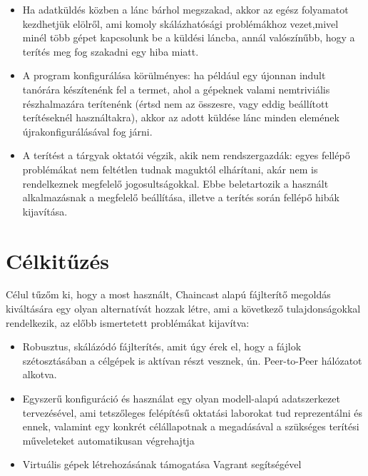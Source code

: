\begin{itemize}
  \item Ha adatküldés közben a lánc bárhol megszakad, akkor az egész folyamatot kezdhetjük elölről, ami komoly skálázhatósági problémákhoz vezet,mivel minél több gépet kapcsolunk be a küldési láncba, annál valószínűbb, hogy a terítés meg fog szakadni egy hiba miatt.
   \item A program konfigurálása körülményes: ha például egy újonnan indult tanórára készítenénk fel a termet, ahol a gépeknek valami nemtriviális részhalmazára terítenénk (értsd nem az összesre, vagy eddig beállított terítéseknél használtakra), akkor az adott küldése lánc minden elemének újrakonfigurálásával fog járni.
   \item A terítést a tárgyak oktatói végzik, akik nem rendszergazdák: egyes fellépő problémákat nem feltétlen tudnak maguktól elhárítani, akár nem is rendelkeznek megfelelő jogosultságokkal. Ebbe beletartozik a használt alkalmazásnak a megfelelő beállítása, illetve a terítés során fellépő hibák kijavítása.
\end{itemize}

\section{Célkitűzés}

Célul tűzőm ki, hogy a most használt, Chaincast alapú fájlterítő megoldás kiváltására egy olyan alternatívát hozzak létre, ami a következő tulajdonságokkal rendelkezik, az előbb ismertetett problémákat kijavítva:

\begin{itemize}
  \item Robusztus, skálázódó fájlterítés, amit úgy érek el, hogy a fájlok szétosztásában a célgépek is aktívan részt vesznek, ún. Peer-to-Peer\cite{p2pdef} hálózatot alkotva.
  \item Egyszerű konfiguráció és használat egy olyan modell-alapú adatszerkezet tervezésével, ami tetszőleges felépítésű oktatási laborokat tud reprezentálni és ennek, valamint egy konkrét célállapotnak a megadásával a szükséges terítési műveleteket automatikusan végrehajtja
  \item Virtuális gépek létrehozásának támogatása Vagrant\cite{vagrant} segítségével
\end{itemize}

